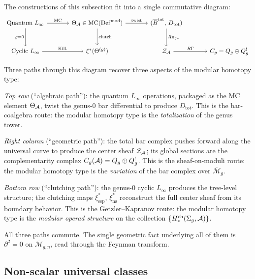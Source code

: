 \begin{remark}
\label{rem:full-recovery-diagram}
The constructions of this subsection fit into a single commutative
diagram:
\[
\begin{tikzcd}[column sep=large, row sep=large]
\text{Quantum } L_\infty
  \arrow[r, "\text{MC}"]
  \arrow[d, "g{=}0"']
& \Theta_\cA \in
  \operatorname{MC}(\operatorname{Def}^{\mathrm{mod}})
  \arrow[r, "\text{twist}"]
  \arrow[d, "\text{clutch}"]
& (\barB^{\mathrm{tot}},\, D_{\mathrm{tot}})
  \arrow[d, "R\pi_{g*}"]
\\
\text{Cyclic } L_\infty
  \arrow[r, "\text{Kill.}"]
& \xi^*(\Theta^{(g)})
& \mathcal{Z}_\cA
  \arrow[r, "R\Gamma"]
& C_g = Q_g \oplus Q_g^!
\end{tikzcd}
\]

\noindent
Three paths through this diagram recover three aspects of the
modular homotopy type:

\smallskip
\emph{Top row} (``algebraic path''): the quantum $L_\infty$
operations, packaged as the MC element $\Theta_{\mathcal{A}}$, twist the
genus-$0$ bar differential to produce $D_{\mathrm{tot}}$.  This is
the bar-coalgebra route: the modular homotopy type is the
\emph{totalization} of the genus tower.

\smallskip
\emph{Right column} (``geometric path''): the total bar complex
pushes forward along the universal curve to produce the center
sheaf $\mathcal{Z}_{\mathcal{A}}$; its global sections are the
complementarity complex $C_g(\mathcal{A}) = Q_g \oplus Q_g^!$.  This
is the sheaf-on-moduli route: the modular homotopy type is the
\emph{variation} of the bar complex over
$\overline{\mathcal{M}}_g$.

\smallskip
\emph{Bottom row} (``clutching path''): the genus-$0$ cyclic
$L_\infty$ produces the tree-level structure; the clutching
maps $\xi_{\mathrm{sep}}^*$, $\xi_{\mathrm{ns}}^*$ reconstruct
the full center sheaf from its boundary behavior.  This is the
Getzler--Kapranov route: the modular homotopy type is the
\emph{modular operad structure} on the collection
$\{H^{\mathrm{ch}}_*(\Sigma_g, \mathcal{A})\}$.

\smallskip\noindent
All three paths commute.  The single geometric fact underlying all of
them is $\partial^2 = 0$ on $\overline{\mathcal{M}}_{g,n}$, read
through the Feynman transform.
\end{remark}

\subsection{Non-scalar universal classes}
\label{subsec:non-scalar-theta}

